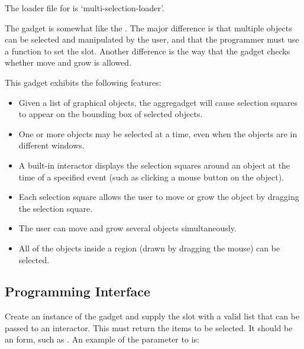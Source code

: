 
The loader file for  is `multi-selection-loader'.

The  gadget is somewhat like the .
The major difference is that multiple objects can be selected and
manipulated by the user, and that the programmer must use a function to set
the  slot.  Another difference is the way that the gadget
checks whether move and grow is allowed.

This gadget exhibits the following features:

\begin{itemize}
\item    Given a list of graphical objects, the 
   aggregadget will cause selection squares to appear on the
   bounding box of selected objects.

\item    One or more objects may be selected at a time, even when the
   objects are in different windows.

\item    A built-in interactor displays the selection squares around an
   object at the time of a specified event (such as clicking a mouse
   button on the object).

\item    Each selection square allows the user to move or grow the object
   by dragging the selection square.

\item    The user can move and grow several objects simultaneously.

\item    All of the objects inside a region (drawn by dragging the mouse) can
   be selected.
\end{itemize}


\subsection{Programming Interface}

Create an instance of the  gadget
and supply the  slot with a valid list that can be passed to
an interactor.  This  must return the items to be selected.
It should be an  form, such as .  An
example of the parameter to  is:

